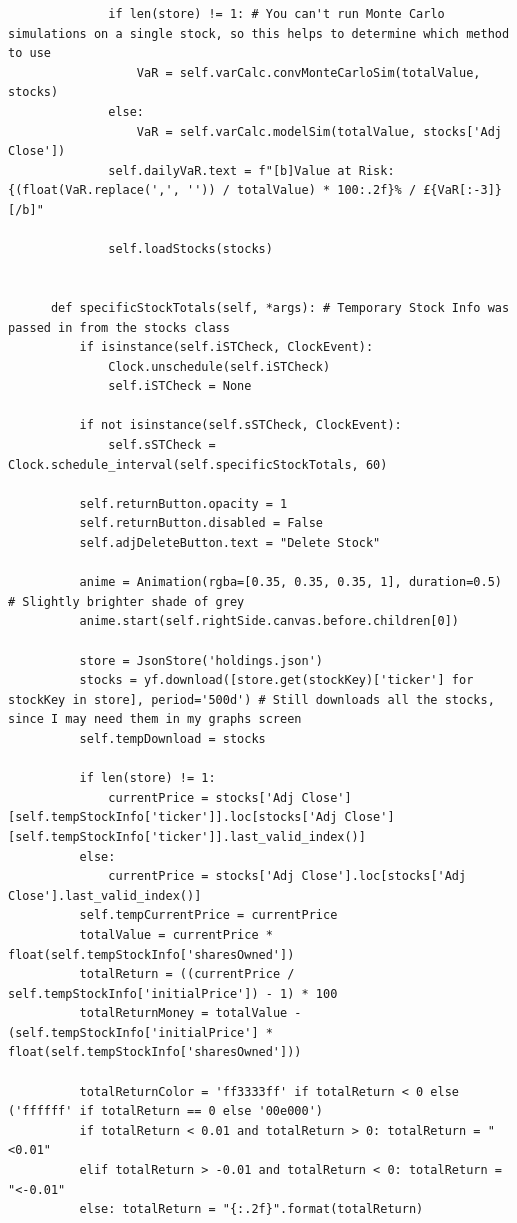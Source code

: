 \documentclass{article}
\begin{document}
\begin{verbatim}
              if len(store) != 1: # You can't run Monte Carlo simulations on a single stock, so this helps to determine which method to use
                  VaR = self.varCalc.convMonteCarloSim(totalValue, stocks)
              else:
                  VaR = self.varCalc.modelSim(totalValue, stocks['Adj Close'])
              self.dailyVaR.text = f"[b]Value at Risk: {(float(VaR.replace(',', '')) / totalValue) * 100:.2f}% / £{VaR[:-3]}[/b]"

              self.loadStocks(stocks)


      def specificStockTotals(self, *args): # Temporary Stock Info was passed in from the stocks class
          if isinstance(self.iSTCheck, ClockEvent):
              Clock.unschedule(self.iSTCheck)
              self.iSTCheck = None

          if not isinstance(self.sSTCheck, ClockEvent):
              self.sSTCheck = Clock.schedule_interval(self.specificStockTotals, 60)

          self.returnButton.opacity = 1
          self.returnButton.disabled = False
          self.adjDeleteButton.text = "Delete Stock"

          anime = Animation(rgba=[0.35, 0.35, 0.35, 1], duration=0.5) # Slightly brighter shade of grey
          anime.start(self.rightSide.canvas.before.children[0])
          
          store = JsonStore('holdings.json')
          stocks = yf.download([store.get(stockKey)['ticker'] for stockKey in store], period='500d') # Still downloads all the stocks, since I may need them in my graphs screen
          self.tempDownload = stocks

          if len(store) != 1:
              currentPrice = stocks['Adj Close'][self.tempStockInfo['ticker']].loc[stocks['Adj Close'][self.tempStockInfo['ticker']].last_valid_index()]
          else:
              currentPrice = stocks['Adj Close'].loc[stocks['Adj Close'].last_valid_index()]
          self.tempCurrentPrice = currentPrice
          totalValue = currentPrice * float(self.tempStockInfo['sharesOwned'])
          totalReturn = ((currentPrice / self.tempStockInfo['initialPrice']) - 1) * 100
          totalReturnMoney = totalValue - (self.tempStockInfo['initialPrice'] * float(self.tempStockInfo['sharesOwned']))

          totalReturnColor = 'ff3333ff' if totalReturn < 0 else ('ffffff' if totalReturn == 0 else '00e000')
          if totalReturn < 0.01 and totalReturn > 0: totalReturn = "<0.01"
          elif totalReturn > -0.01 and totalReturn < 0: totalReturn = "<-0.01"
          else: totalReturn = "{:.2f}".format(totalReturn)


\end{verbatim}
\end{document}
